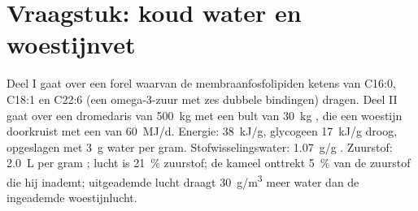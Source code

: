 \section{Vraagstuk: koud water en woestijnvet}

\begin{problem}
\label{pb:b1:lipids:1}
Deel I gaat over een forel waarvan de membraanfosfolipiden ketens van C16:0,
C18:1 en C22:6 (een omega-3-zuur met zes dubbele bindingen) dragen. Deel II gaat
over een dromedaris van \qty{500}{kg} met een bult van \qty{30}{kg} ,
die een woestijn doorkruist met een  van \qty{60}{MJ/d}.
Energie:  \qty{38}{kJ/g}, glycogeen \qty{17}{kJ/g} droog, opgeslagen met
\qty{3}{g} water per gram. Stofwisselingswater: \qty{1.07}{g/g} . Zuurstof:
\qty{2.0}{L} per gram ; lucht is \qty{21}{\%} zuurstof; de kameel onttrekt
\qty{5}{\%} van de zuurstof die hij inademt; uitgeademde lucht draagt
\qty{30}{g/m^3} meer water dan de ingeademde woestijnlucht.


\end{problem}
